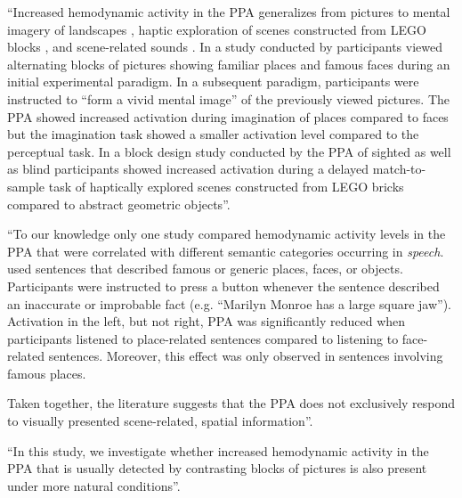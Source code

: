 ``Increased hemodynamic activity in the PPA generalizes from pictures to mental
imagery of landscapes \citep{ocraven2000mental}, haptic exploration of
scenes constructed from LEGO blocks \citep{wolbers2011modality}, and
scene-related sounds \citep{van2017development}.
In a study conducted by \citet{ocraven2000mental} participants viewed
alternating blocks of pictures showing familiar places and famous faces during
an initial experimental paradigm.
In a subsequent paradigm, participants were instructed to ``form a vivid mental
image'' of the previously viewed pictures.
The PPA showed increased activation during imagination of places compared to
faces but the imagination task showed a smaller activation level compared to the
perceptual task.
In a block design study conducted by \citet{wolbers2011modality} the PPA of
sighted as well as blind participants showed increased activation during a
delayed match-to-sample task of haptically explored scenes constructed from LEGO
bricks compared to abstract geometric objects''.

``To our knowledge only one study \citep{aziz2008modulation} compared hemodynamic
activity levels in the PPA that were correlated with different semantic
categories occurring in \textit{speech}.
\citet{aziz2008modulation} used sentences that described famous or generic
places, faces, or objects.
Participants were instructed to press a button whenever the sentence described
an inaccurate or improbable fact (e.g. ``Marilyn Monroe has a large square
jaw'').
Activation in the left, but not right, PPA was significantly reduced when
participants listened to place-related sentences compared to listening to
face-related sentences. Moreover, this effect was only observed in sentences
involving famous places.

Taken together, the literature suggests that the PPA does not exclusively
respond to visually presented scene-related, spatial information''.

``In this study, we investigate whether increased hemodynamic activity in the PPA
that is usually detected by contrasting blocks of pictures is also present under
more natural conditions''.

